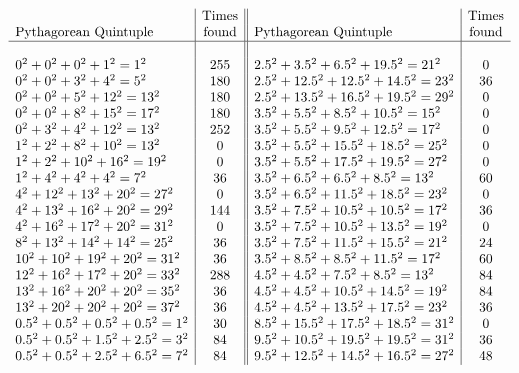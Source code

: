 \documentclass[12pt]{article}
\theoremstyle{definition}
\numberwithin{equation}{section}
\begin{document}
\begin{appendices}
\begin{figure}
$$
\begin{array}{l|c||l|c}
                  &\mbox{Times}    &   &\mbox{Times}\\ 
\mbox{Pythagorean Quintuple}     &\mbox{found}
&\mbox{Pythagorean Quintuple}     &\mbox{found}\\ \hline
&&&\\
0^2+ 0^2+ 0^2+ 1^2  = 1^2 & 255
& 2.5^2+ 3.5^2+ 6.5^2+ 19.5^2  = 21^2 &0\\
0^2+ 0^2+ 3^2+ 4^2  = 5^2 &180
&2.5^2+ 12.5^2+ 12.5^2+ 14.5^2  = 23^2 &36\\
0^2+ 0^2+ 5^2+ 12^2  = 13^2 &180&
2.5^2+ 13.5^2+ 16.5^2+ 19.5^2  = 29^2 &0\\
%
0^2+ 0^2+ 8^2+ 15^2  = 17^2 &180&
3.5^2+ 5.5^2+ 8.5^2+ 10.5^2  = 15^2 &0\\
%
0^2+ 3^2+ 4^2+ 12^2  = 13^2 &252&
3.5^2+ 5.5^2+ 9.5^2+ 12.5^2  = 17^2 &0\\
%
1^2+ 2^2+ 8^2+ 10^2  = 13^2 &0&
3.5^2+ 5.5^2+ 15.5^2+ 18.5^2  = 25^2 &0\\
%
1^2+ 2^2+ 10^2+ 16^2  = 19^2 &0&
3.5^2+ 5.5^2+ 17.5^2+ 19.5^2  = 27^2 &0\\
%
1^2+ 4^2+ 4^2+ 4^2  = 7^2 &36&
3.5^2+ 6.5^2+ 6.5^2+ 8.5^2  = 13^2 &60\\
%
4^2+ 12^2+ 13^2+ 20^2  = 27^2 &0&
3.5^2+ 6.5^2+ 11.5^2+ 18.5^2  = 23^2 &0\\
%
4^2+ 13^2+ 16^2+ 20^2  = 29^2 &144&
3.5^2+ 7.5^2+ 10.5^2+ 10.5^2  = 17^2 &36\\
%
4^2+ 16^2+ 17^2+ 20^2  = 31^2 &0&
3.5^2+ 7.5^2+ 10.5^2+ 13.5^2  = 19^2 &0\\
%
8^2+ 13^2+ 14^2+ 14^2  = 25^2 &36&
3.5^2+ 7.5^2+ 11.5^2+ 15.5^2  = 21^2 &24\\
%
10^2+ 10^2+ 19^2+ 20^2  = 31^2 &36&
3.5^2+ 8.5^2+ 8.5^2+ 11.5^2  = 17^2 &60\\
%
12^2+ 16^2+ 17^2+ 20^2  = 33^2 &288&
4.5^2+ 4.5^2+ 7.5^2+ 8.5^2  = 13^2 &84\\
%
13^2+ 16^2+ 20^2+ 20^2  = 35^2 &36&
4.5^2+ 4.5^2+ 10.5^2+ 14.5^2  = 19^2 &84\\
%
13^2+ 20^2+ 20^2+ 20^2  = 37^2 &36&
4.5^2+ 4.5^2+ 13.5^2+ 17.5^2  = 23^2 &36\\
%
0.5^2+ 0.5^2+ 0.5^2+ 0.5^2  = 1^2 &30&
8.5^2+ 15.5^2+ 17.5^2+ 18.5^2  = 31^2 &0\\
%
0.5^2+ 0.5^2+ 1.5^2+ 2.5^2  = 3^2 &84&
9.5^2+ 10.5^2+ 19.5^2+ 19.5^2  = 31^2 &36\\
%
0.5^2+ 0.5^2+ 2.5^2+ 6.5^2  = 7^2 &84&
9.5^2+ 12.5^2+ 14.5^2+ 16.5^2  = 27^2 &48\\

\end{array}$$
\end{figure}
\end{appendices}
\end{document}

